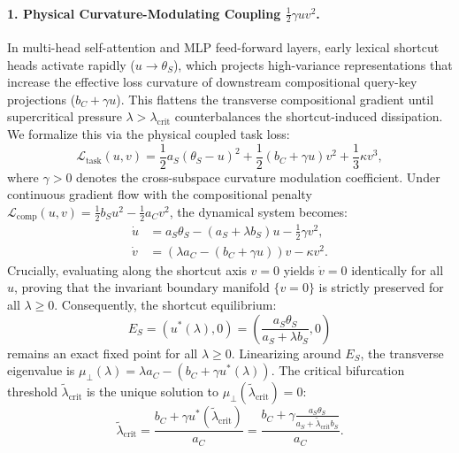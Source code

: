 \documentclass{article}
\theoremstyle{plain}
\theoremstyle{definition}
\begin{document}
\paragraph{1. Physical Curvature-Modulating Coupling $\frac{1}{2}\gamma u v^2$.}
In multi-head self-attention and MLP feed-forward layers, early lexical shortcut heads activate rapidly ($u \to \theta_S$), which projects high-variance representations that increase the effective loss curvature of downstream compositional query-key projections ($b_C + \gamma u$). This flattens the transverse compositional gradient until supercritical pressure $\lambda > \lambda_{\text{crit}}$ counterbalances the shortcut-induced dissipation. We formalize this via the physical coupled task loss:
\begin{equation}
    \mathcal{L}_{\text{task}}(u, v) = \frac{1}{2} a_S (\theta_S - u)^2 + \frac{1}{2} (b_C + \gamma u) v^2 + \frac{1}{3} \kappa v^3,
\end{equation}
where $\gamma > 0$ denotes the cross-subspace curvature modulation coefficient. Under continuous gradient flow with the compositional penalty $\mathcal{L}_{\text{comp}}(u, v) = \frac{1}{2} b_S u^2 - \frac{1}{2} a_C v^2$, the dynamical system becomes:
\begin{align}
    \dot{u} &= a_S \theta_S - (a_S + \lambda b_S) u - \frac{1}{2} \gamma v^2, \label{eq:curv_coupled_u} \\
    \dot{v} &= \left(\lambda a_C - (b_C + \gamma u)\right) v - \kappa v^2. \label{eq:curv_coupled_v}
\end{align}
Crucially, evaluating along the shortcut axis $v = 0$ yields $\dot{v} = 0$ identically for all $u$, proving that the invariant boundary manifold $\{v = 0\}$ is strictly preserved for all $\lambda \ge 0$. Consequently, the shortcut equilibrium:
\begin{equation}
    E_S = (u^*(\lambda), 0) = \left( \frac{a_S \theta_S}{a_S + \lambda b_S}, 0 \right)
\end{equation}
remains an exact fixed point for all $\lambda \ge 0$. Linearizing around $E_S$, the transverse eigenvalue is $\mu_\perp(\lambda) = \lambda a_C - \left(b_C + \gamma u^*(\lambda)\right)$. The critical bifurcation threshold $\tilde{\lambda}_{\text{crit}}$ is the unique solution to $\mu_\perp(\tilde{\lambda}_{\text{crit}}) = 0$:
\begin{equation}
    \tilde{\lambda}_{\text{crit}} = \frac{b_C + \gamma u^*(\tilde{\lambda}_{\text{crit}})}{a_C} = \frac{b_C + \gamma \frac{a_S \theta_S}{a_S + \tilde{\lambda}_{\text{crit}} b_S}}{a_C}.
\end{equation}
\end{document}
